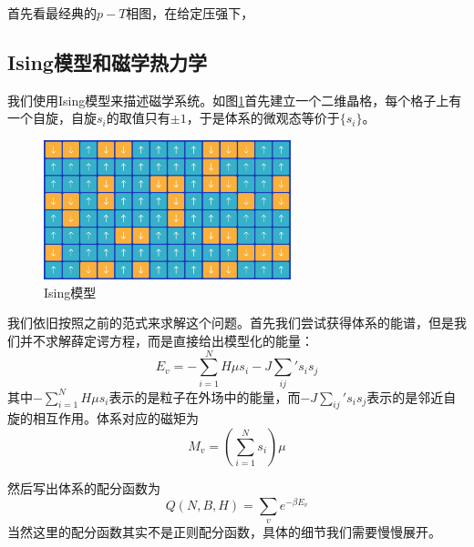 \documentclass[AutoFakeBold]{tstextbook}
\begin{document}
首先看最经典的$p-T$相图，在给定压强下，
\subsection{Ising模型和磁学热力学} %
\label{sub:Ising模型和磁学热力学}
我们使用Ising模型来描述磁学系统。如图\ref{fig:Ising model}首先建立一个二维晶格，每个格子上有一个自旋，自旋$s_i$的取值只有$\pm 1$，于是体系的微观态等价于$\{s_i\}$。

\begin{figure}[h]
       \centering
       \includegraphics[width=0.64\textwidth]{fig/ising model.png}
       \caption{Ising模型}
       \label{fig:Ising model}
\end{figure}

我们依旧按照之前的范式来求解这个问题。首先我们尝试获得体系的能谱，但是我们并不求解薛定谔方程，而是直接给出模型化的能量：\begin{equation}
    E_v = -\sum_{i=1}^{N} H \mu s_i -J \sum_{ij}' s_i s_j 
\end{equation}
其中$\displaystyle -\sum_{i=1}^{N} H \mu s_i$表示的是粒子在外场中的能量，而$\displaystyle -J \sum_{ij}' s_i s_j$表示的是邻近自旋的相互作用。体系对应的磁矩为\begin{equation}
    M_v = \left(\sum_{i=1}^{N}s_i\right)\mu
\end{equation}

然后写出体系的配分函数为\begin{equation}
    Q(N,B,H) = \sum_v e^{-\beta E_v}
\end{equation}
当然这里的配分函数其实不是正则配分函数，具体的细节我们需要慢慢展开。
\end{document}
